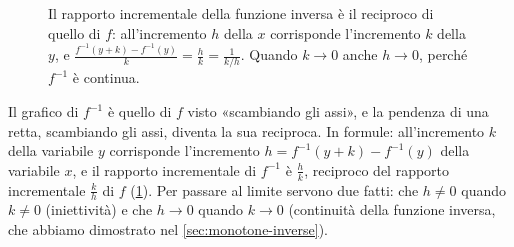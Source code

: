 \begin{figure}[htb]
\centering
{}
\caption{Il rapporto incrementale della funzione inversa è il reciproco di quello di $f$:
all'incremento $h$ della $x$ corrisponde l'incremento $k$ della $y$, e
$\frac{f^{-1}(y+k)-f^{-1}(y)}{k}=\frac hk=\frac1{k/h}$. Quando $k\to0$ anche $h\to0$,
perché $f^{-1}$ è continua.}
\label{fig:derivata-inversa}
\end{figure}

\begin{strategia}
Il grafico di $f^{-1}$ è quello di $f$ visto «scambiando gli assi», e la pendenza di una
retta, scambiando gli assi, diventa la sua reciproca. In formule: all'incremento $k$ della
variabile $y$ corrisponde l'incremento $h=f^{-1}(y+k)-f^{-1}(y)$ della variabile $x$, e il
rapporto incrementale di $f^{-1}$ è $\frac hk$, reciproco del rapporto incrementale
$\frac kh$ di $f$ (\cref{fig:derivata-inversa}). Per passare al limite servono due fatti:
che $h\neq0$ quando $k\neq0$ (iniettività) e che $h\to0$ quando $k\to0$ (continuità della
funzione inversa, che abbiamo dimostrato nel \cref{sec:monotone-inverse}).
\end{strategia}

